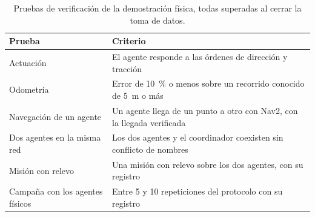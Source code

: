 \begin{table}[H]
  \centering\footnotesize
  \caption{Pruebas de verificación de la demostración física, todas superadas al cerrar la toma de datos.}
  \label{tab:pruebas-verificacion}
  \begin{tabular}{@{}p{}p{}@{}}
    \toprule
    \textbf{Prueba} & \textbf{Criterio} \\ \midrule
    Actuación & El agente responde a las órdenes de dirección y tracción \\
    Odometría & Error de 10~\% o menos sobre un recorrido conocido de 5~m o más \\
    Navegación de un agente & Un agente llega de un punto a otro con Nav2, con la llegada verificada \\
    Dos agentes en la misma red & Los dos agentes y el coordinador coexisten sin conflicto de nombres \\
    Misión con relevo & Una misión con relevo sobre los dos agentes, con su registro \\
    Campaña con los agentes físicos & Entre 5 y 10 repeticiones del protocolo con su registro \\ \bottomrule
  \end{tabular}
\end{table}
